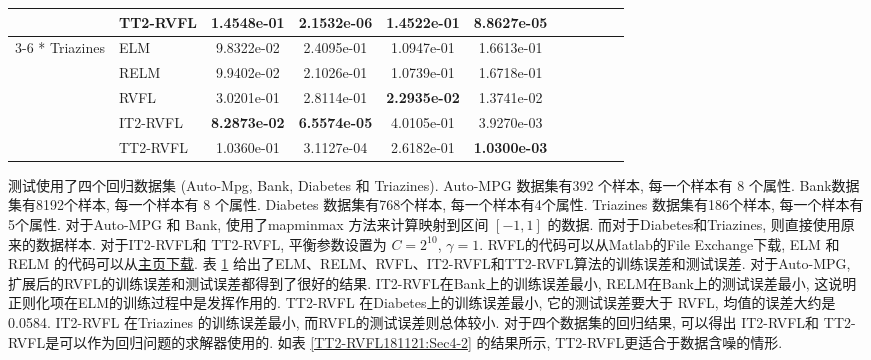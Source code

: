 {\begin{table} [H]
\begin{center}
\begin{tabular} {llccccccccc}
&TT2-RVFL&\textbf{1.4548e-01}  &  \textbf{2.1532e-06}   & 1.4522e-01  & \textbf{8.8627e-05} \\
\cline{3-6}
\multirow{5} {*} {Triazines} &ELM &9.8322e-02   &2.4095e-01   &1.0947e-01   &1.6613e-01   \\
&RELM    &9.9402e-02   &2.1026e-01   &1.0739e-01   &1.6718e-01\\
&RVFL &3.0201e-01 &  2.8114e-01  & \textbf{2.2935e-02}   & 1.3741e-02\\
&IT2-RVFL&\textbf{8.2873e-02}  &  \textbf{6.5574e-05}  &  4.0105e-01  & 3.9270e-03\\
&TT2-RVFL&1.0360e-01  & 3.1127e-04 &  2.6182e-01 &  \textbf{1.0300e-03} \\
\hline
\end{tabular}
\end{center}
\label{TT2-RVFL181116:Sec4-1}
\end{table}
测试使用了四个回归数据集 (Auto-Mpg, Bank, Diabetes 和  Triazines).
Auto-MPG 数据集有392 个样本, 每一个样本有 8 个属性.   Bank数据集有8192个样本, 每一个样本有 8 个属性.
Diabetes 数据集有768个样本, 每一个样本有4个属性.  Triazines 数据集有186个样本, 每一个样本有5个属性.
对于Auto-MPG 和 Bank, 使用了mapminmax 方法来计算映射到区间 $[-1,1]$ 的数据.
而对于Diabetes和Triazines, 则直接使用原来的数据样本.
对于IT2-RVFL和 TT2-RVFL, 平衡参数设置为 $C=2^{10}$, $\gamma =1$.
RVFL的代码可以从Matlab的File Exchange下载,  ELM 和RELM 的代码可以从\href{https://www.ntu.edu.sg/home/egbhuang/elm_random_hidden_nodes.html}{主页下载}.
表 \ref{TT2-RVFL181116:Sec4-1} 给出了ELM、RELM、RVFL、IT2-RVFL和TT2-RVFL算法的训练误差和测试误差.
对于Auto-MPG, 扩展后的RVFL的训练误差和测试误差都得到了很好的结果.
IT2-RVFL在Bank上的训练误差最小,  RELM在Bank上的测试误差最小, 这说明正则化项在ELM的训练过程中是发挥作用的.
TT2-RVFL 在Diabetes上的训练误差最小, 它的测试误差要大于 RVFL, 均值的误差大约是0.0584.
IT2-RVFL 在Triazines 的训练误差最小, 而RVFL的测试误差则总体较小.
对于四个数据集的回归结果, 可以得出 IT2-RVFL和 TT2-RVFL是可以作为回归问题的求解器使用的.
如表 \ref{TT2-RVFL181121:Sec4-2} 的结果所示, TT2-RVFL更适合于数据含噪的情形.
}
